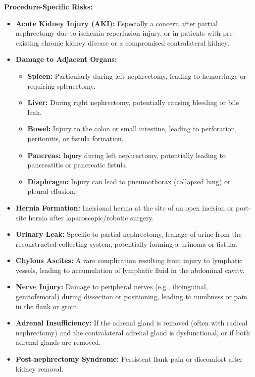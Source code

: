 \textbf{Procedure-Specific Risks:}
\begin{itemize}
  \item \textbf{Acute Kidney Injury (AKI):} Especially a concern after partial nephrectomy due to ischemia-reperfusion injury, or in patients with pre-existing chronic kidney disease or a compromised contralateral kidney.
  \item \textbf{Damage to Adjacent Organs:}
    \begin{itemize}
      \item \textbf{Spleen:} Particularly during left nephrectomy, leading to hemorrhage or requiring splenectomy.
      \item \textbf{Liver:} During right nephrectomy, potentially causing bleeding or bile leak.
      \item \textbf{Bowel:} Injury to the colon or small intestine, leading to perforation, peritonitis, or fistula formation.
      \item \textbf{Pancreas:} Injury during left nephrectomy, potentially leading to pancreatitis or pancreatic fistula.
      \item \textbf{Diaphragm:} Injury can lead to pneumothorax (collapsed lung) or pleural effusion.
    \end{itemize}
  \item \textbf{Hernia Formation:} Incisional hernia at the site of an open incision or port-site hernia after laparoscopic/robotic surgery.
  \item \textbf{Urinary Leak:} Specific to partial nephrectomy, leakage of urine from the reconstructed collecting system, potentially forming a urinoma or fistula.
  \item \textbf{Chylous Ascites:} A rare complication resulting from injury to lymphatic vessels, leading to accumulation of lymphatic fluid in the abdominal cavity.
  \item \textbf{Nerve Injury:} Damage to peripheral nerves (e.g., ilioinguinal, genitofemoral) during dissection or positioning, leading to numbness or pain in the flank or groin.
  \item \textbf{Adrenal Insufficiency:} If the adrenal gland is removed (often with radical nephrectomy) and the contralateral adrenal gland is dysfunctional, or if both adrenal glands are removed.
  \item \textbf{Post-nephrectomy Syndrome:} Persistent flank pain or discomfort after kidney removal.
\end{itemize}

